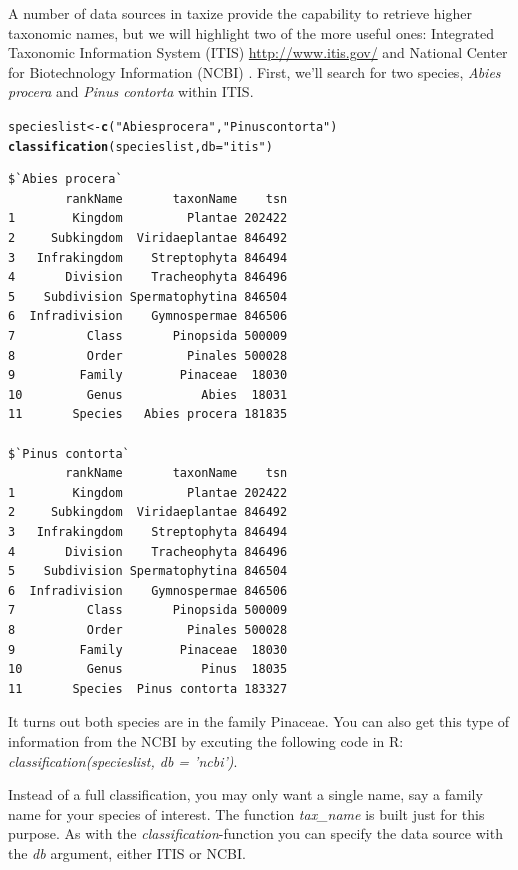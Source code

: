 \documentclass[10pt,a4paper,twocolumn]{article}
\makeatletter
\newcommand{\hlfunctioncall}[1]{\textcolor[rgb]{0.501960784313725,0,0.329411764705882}{\textbf{#1}}}%
\newcommand{\hlstring}[1]{\textcolor[rgb]{0.6,0.6,1}{#1}}%
\newenvironment{kframe}{%
 \def\at@end@of@kframe{}%
 \ifinner\ifhmode%
  \def\at@end@of@kframe{\end{minipage}}%
  \begin{minipage}{\columnwidth}%
 \fi\fi%
 \def\FrameCommand##1{\hskip\@totalleftmargin \hskip-\fboxsep
 \colorbox{shadecolor}{##1}\hskip-\fboxsep
     \hskip-\linewidth \hskip-\@totalleftmargin \hskip\columnwidth}%
 \MakeFramed {\advance\hsize-\width
   \@totalleftmargin\z@ \linewidth\hsize
   \@setminipage}}%
 {\par\unskip\endMakeFramed%
 \at@end@of@kframe}
\newenvironment{knitrout}{}{} %
\makeatother
\begin{document}
A number of data sources in taxize provide the capability to retrieve higher taxonomic names, but we will highlight two of the more useful ones: Integrated Taxonomic Information System (ITIS) \url{http://www.itis.gov/} and National Center for Biotechnology Information (NCBI) \cite{federhen}. First, we'll search for two species, \emph{Abies procera} and \emph{Pinus contorta} within ITIS.

\begin{knitrout}
\begin{scriptsize}
\color{fgcolor}\begin{kframe}
\begin{alltt}
specieslist <- \hlfunctioncall{c}(\hlstring{"Abies procera"}, \hlstring{"Pinus contorta"})
\hlfunctioncall{classification}(specieslist, db = \hlstring{"itis"})
\end{alltt}
\begin{verbatim}
$`Abies procera`
        rankName       taxonName    tsn
1        Kingdom         Plantae 202422
2     Subkingdom  Viridaeplantae 846492
3   Infrakingdom    Streptophyta 846494
4       Division    Tracheophyta 846496
5    Subdivision Spermatophytina 846504
6  Infradivision    Gymnospermae 846506
7          Class       Pinopsida 500009
8          Order         Pinales 500028
9         Family        Pinaceae  18030
10         Genus           Abies  18031
11       Species   Abies procera 181835

$`Pinus contorta`
        rankName       taxonName    tsn
1        Kingdom         Plantae 202422
2     Subkingdom  Viridaeplantae 846492
3   Infrakingdom    Streptophyta 846494
4       Division    Tracheophyta 846496
5    Subdivision Spermatophytina 846504
6  Infradivision    Gymnospermae 846506
7          Class       Pinopsida 500009
8          Order         Pinales 500028
9         Family        Pinaceae  18030
10         Genus           Pinus  18035
11       Species  Pinus contorta 183327
\end{verbatim}
\end{kframe}
\end{scriptsize}
\end{knitrout}


It turns out both species are in the family Pinaceae. You can also get this type of information from the NCBI by excuting the following code in R: \emph{classification(specieslist, db = 'ncbi')}.

Instead of a full classification, you may only want a single name, say a family name for your species of interest. The function \emph{tax\_name} is built just for this purpose. As with the \emph{classification}-function you can specify the data source with the \emph{db} argument, either ITIS or NCBI. 
\end{document}

